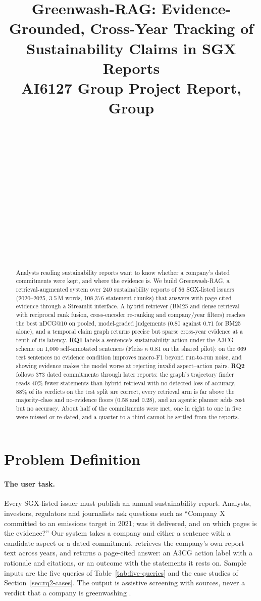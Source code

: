 \documentclass[11pt]{article}
\title{Greenwash-RAG: Evidence-Grounded, Cross-Year Tracking of\\Sustainability Claims in SGX Reports\\
  {\large AI6127 Group Project Report, Group \groupno}}
\author{%
  \memberA \\ \matricA \\ \texttt{\mailA} \And
  \memberB \\ \matricB \\ \texttt{\mailB} \And
  \memberC \\ \matricC \\ \texttt{\mailC} \AND
  \memberD \\ \matricD \\ \texttt{\mailD} \And
  \memberE \\ \matricE \\ \texttt{\mailE} \And
  \memberF \\ \matricF \\ \texttt{\mailF} \\
}
\newcommand{\kappaval}{$\kappa$}
\begin{document}
\maketitle

\begin{abstract}
Analysts reading sustainability reports want to know whether a company's dated commitments were kept, and where the evidence is. We build Greenwash-RAG, a retrieval-augmented system over 240 sustainability reports of 56 SGX-listed issuers (2020--2025, 3.5\,M words, 108,376 statement chunks) that answers with page-cited evidence through a Streamlit interface. A hybrid retriever (BM25 and dense retrieval with reciprocal rank fusion, cross-encoder re-ranking and company/year filters) reaches the best nDCG@10 on pooled, model-graded judgements (0.80 against 0.71 for BM25 alone), and a temporal claim graph returns precise but sparse cross-year evidence at a tenth of its latency. \textbf{RQ1} labels a sentence's sustainability action under the A3CG scheme on 1,000 self-annotated sentences (Fleiss \kappaval{} 0.81 on the shared pilot): on the 669 test sentences no evidence condition improves macro-F1 beyond run-to-run noise, and showing evidence makes the model worse at rejecting invalid aspect--action pairs. \textbf{RQ2} follows 373 dated commitments through later reports: the graph's trajectory finder reads 40\% fewer statements than hybrid retrieval with no detected loss of accuracy, 88\% of its verdicts on the test split are correct, every retrieval arm is far above the majority-class and no-evidence floors (0.58 and 0.28), and an agentic planner adds cost but no accuracy. About half of the commitments were met, one in eight to one in five were missed or re-dated, and a quarter to a third cannot be settled from the reports.
\end{abstract}

\section{Problem Definition}
\label{sec:problem}

\paragraph{The user task.}
Every SGX-listed issuer must publish an annual sustainability report. Analysts, investors, regulators and journalists ask questions such as ``Company X committed to an emissions target in 2021; was it delivered, and on which pages is the evidence?'' Our system takes a company and either a sentence with a candidate aspect or a dated commitment, retrieves the company's own report text across years, and returns a page-cited answer: an A3CG action label with a rationale and citations, or an outcome with the statements it rests on. Sample inputs are the five queries of Table~\ref{tab:five-queries} and the case studies of Section~\ref{sec:rq2-cases}. The output is assistive screening with sources, never a verdict that a company is greenwashing \citep{ong-etal-2025-a3cg,calamai2025survey}.
\end{document}
